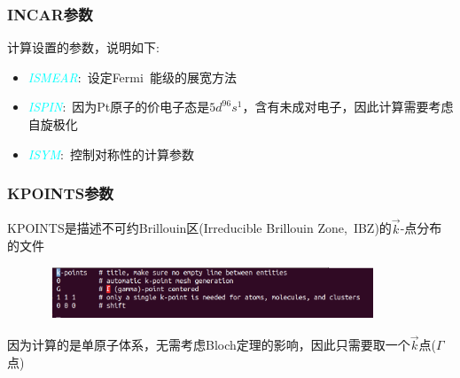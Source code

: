 \frame
{
	\frametitle{\textrm{INCAR}参数}
计算设置的参数，说明如下:~
\begin{itemize}
	\item \textcolor{cyan}{\textit{ISMEAR}}:~设定\textrm{Fermi~}能级的展宽方法
		\vskip 5pt
		{\fontsize{7.2pt}{5.2pt}}
	\item \textcolor{cyan}{\textit{ISPIN}}:~因为\textrm{Pt}原子的价电子态是$5\mathit{d}^96\mathit{s}^1$，含有未成对电子，因此计算需要考虑自旋极化
	\vskip 5pt
	{\fontsize{7.2pt}{5.2pt}}
	\item \textcolor{cyan}{\textit{ISYM}}:~控制对称性的计算参数%
\end{itemize}
}
\frame
{
	\frametitle{\textrm{KPOINTS}参数}
\textrm{KPOINTS}是描述不可约\textrm{Brillouin}区(\textrm{Irreducible Brillouin Zone,~IBZ})的$\vec k$-点分布的文件%
\begin{figure}[h!]
\centering
\vskip -5pt
\includegraphics[height=0.60in,width=4.0in, viewport=0 20 750 118,clip]{Figures/Pt_atom-KPOINTS.png}
\caption{\fontsize{6.2pt}{5.2pt}}%
\label{Pt_atom:KPOINTS}
\end{figure}
因为计算的是单原子体系，无需考虑\textrm{Bloch}定理的影响，因此只需要取一个$\vec k$点($\Gamma$点)
}
\frame
